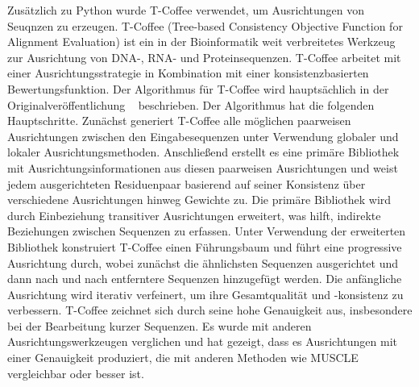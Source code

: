 \documentclass[german,version-2022-01]{uzl-thesis}
\begin{document}
Zus\"atzlich zu Python wurde T-Coffee verwendet, um Ausrichtungen von Seuqnzen zu erzeugen. T-Coffee (Tree-based Consistency Objective Function for Alignment Evaluation) ist ein in der Bioinformatik weit verbreitetes Werkzeug zur Ausrichtung von DNA-, RNA- und Proteinsequenzen. T-Coffee arbeitet mit einer Ausrichtungsstrategie in Kombination mit einer konsistenzbasierten Bewertungsfunktion. Der Algorithmus f\"ur T-Coffee wird haupts\"achlich in der Originalver\"offentlichung ~\cite{poirot_tcoffeeigs_2003} beschrieben. Der Algorithmus hat die folgenden Hauptschritte. Zun\"achst generiert T-Coffee alle m\"oglichen paarweisen Ausrichtungen zwischen den Eingabesequenzen unter Verwendung globaler und lokaler Ausrichtungsmethoden. Anschlie\ss{}end erstellt es eine prim\"are Bibliothek mit Ausrichtungsinformationen aus diesen paarweisen Ausrichtungen und weist jedem ausgerichteten Residuenpaar basierend auf seiner Konsistenz \"uber verschiedene Ausrichtungen hinweg Gewichte zu. Die prim\"are Bibliothek wird durch Einbeziehung transitiver Ausrichtungen erweitert, was hilft, indirekte Beziehungen zwischen Sequenzen zu erfassen. Unter Verwendung der erweiterten Bibliothek konstruiert T-Coffee einen F\"uhrungsbaum und f\"uhrt eine progressive Ausrichtung durch, wobei zun\"achst die \"ahnlichsten Sequenzen ausgerichtet und dann nach und nach entferntere Sequenzen hinzugef\"ugt werden. Die anf\"angliche Ausrichtung wird iterativ verfeinert, um ihre Gesamtqualit\"at und -konsistenz zu verbessern.
T-Coffee zeichnet sich durch seine hohe Genauigkeit aus, insbesondere bei der Bearbeitung kurzer Sequenzen. Es wurde mit anderen Ausrichtungswerkzeugen verglichen und hat gezeigt, dass es Ausrichtungen mit einer Genauigkeit produziert, die mit anderen Methoden wie MUSCLE~\cite{Edgar2004MUSCLEL} vergleichbar oder besser ist.
\end{document}
